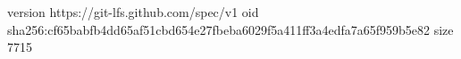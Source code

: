 version https://git-lfs.github.com/spec/v1
oid sha256:cf65babfb4dd65af51cbd654e27fbeba6029f5a411ff3a4edfa7a65f959b5e82
size 7715
